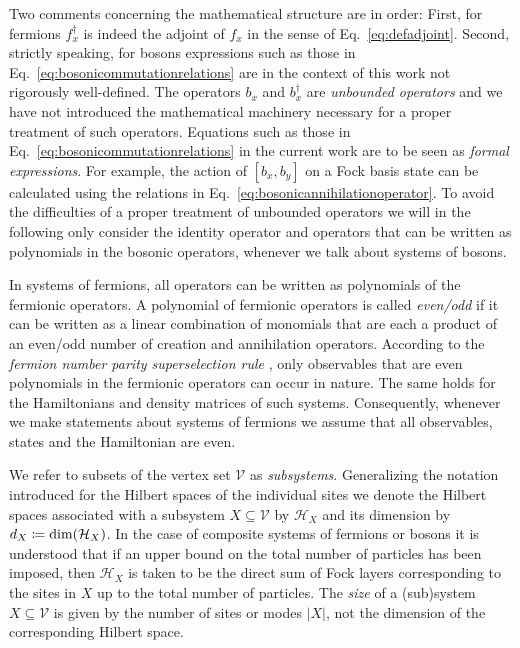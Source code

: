 \documentclass[a4paper,12pt,listof=totoc,index=totoc,bibliography=totoc,headsepline=false,headings=normal,BCOR16.153846mm,DIV12,headinclude,twoside,cleardoublepage=empty,numbers=noenddot,final]{scrreprt}
\theoremstyle{mystyle}
\numberwithin{equation}{section}
\numberwithin{figure}{section}
\numberwithin{lemma}{section}
\numberwithin{theorem}{section}
\numberwithin{corollary}{section}
\numberwithin{definition}{section}
\numberwithin{conjecture}{section}
\numberwithin{observation}{section}
\newcommand{\+}{\mkern2mu}
\newcommand{\coloneqq}{\mathrel{\vcentcolon\mkern-1.2mu=}} %
\newcommand{\texteqref}[1]{Eq.~\eqref{#1}}
\newcommand{\Vset}{\mathcal{V}}
\newcommand{\ad}{^\dagger}
\DeclareMathOperator{\1}{\mathds{1}}
\newcommand{\mc}[1]{\mathcal{#1}}
\newcommand{\mcH}{\mc{H}}
\begin{document}
Two comments concerning the mathematical structure are in order:
First, for fermions $f\ad_x$ is indeed the adjoint of $f_x$ in the sense of \texteqref{eq:defadjoint}.
Second, strictly speaking, for bosons expressions such as those in \texteqref{eq:bosonicommutationrelations} are in the context of this work not rigorously well-defined.
The operators $b_x$ and $b\ad_x$ are \emph{unbounded operators} and we have not introduced the mathematical machinery necessary for a proper treatment of such operators.
Equations such as those in \texteqref{eq:bosonicommutationrelations} in the current work are to be seen as \emph{formal expressions}.
For example, the action of $[b_x,b_y]$ on a Fock basis state can be calculated using the relations in \texteqref{eq:bosonicannihilationoperator}.
To avoid the difficulties of a proper treatment of unbounded operators we will in the following only consider the identity operator and operators that can be written as polynomials in the bosonic operators, whenever we talk about systems of bosons.

In systems of fermions, all operators can be written as polynomials of the fermionic operators.
A polynomial of fermionic operators is called \emph{even/odd} if it can be written as a linear combination of monomials that are each a product of an even/odd number of creation and annihilation operators.
According to the \emph{fermion number parity superselection rule} \cite{Banuls2009}, only observables that are even polynomials in the fermionic operators can occur in nature.
The same holds for the Hamiltonians and density matrices of such systems.
Consequently, whenever we make statements about systems of fermions we assume that all observables, states and the Hamiltonian are even.

We refer to subsets of the vertex set $\Vset$ as \emph{subsystems}.
Generalizing the notation introduced for the Hilbert spaces of the individual sites we denote the Hilbert spaces associated with a subsystem $X \subseteq \Vset$ by $\mcH_X$ and its dimension by $d_X\coloneqq\dim(\mcH_X)$.
In the case of composite systems of fermions or bosons it is understood that if an upper bound on the total number of particles has been imposed, then $\mcH_X$ is taken to be the direct sum of Fock layers corresponding to the sites in $X$ up to the total number of particles.
The \emph{size} of a (sub)system $X \subseteq \Vset$ is given by the number of sites or modes $|X|$, not the dimension of the corresponding Hilbert space.
\end{document}
